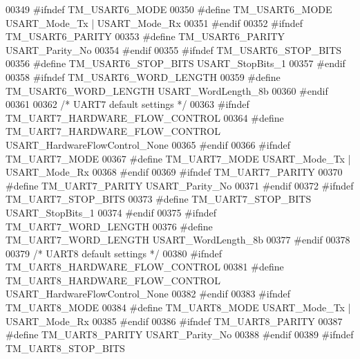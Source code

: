 \begin{DoxyCode}
00349 \textcolor{preprocessor}{#ifndef TM\_USART6\_MODE}
00350 \textcolor{preprocessor}{#define TM\_USART6\_MODE                      USART\_Mode\_Tx | USART\_Mode\_Rx}
00351 \textcolor{preprocessor}{#endif}
00352 \textcolor{preprocessor}{#ifndef TM\_USART6\_PARITY}
00353 \textcolor{preprocessor}{#define TM\_USART6\_PARITY                    USART\_Parity\_No}
00354 \textcolor{preprocessor}{#endif}
00355 \textcolor{preprocessor}{#ifndef TM\_USART6\_STOP\_BITS}
00356 \textcolor{preprocessor}{#define TM\_USART6\_STOP\_BITS                 USART\_StopBits\_1}
00357 \textcolor{preprocessor}{#endif}
00358 \textcolor{preprocessor}{#ifndef TM\_USART6\_WORD\_LENGTH}
00359 \textcolor{preprocessor}{#define TM\_USART6\_WORD\_LENGTH               USART\_WordLength\_8b}
00360 \textcolor{preprocessor}{#endif}
00361 
00362 \textcolor{comment}{/* UART7 default settings */}
00363 \textcolor{preprocessor}{#ifndef TM\_UART7\_HARDWARE\_FLOW\_CONTROL}
00364 \textcolor{preprocessor}{#define TM\_UART7\_HARDWARE\_FLOW\_CONTROL      USART\_HardwareFlowControl\_None}
00365 \textcolor{preprocessor}{#endif}
00366 \textcolor{preprocessor}{#ifndef TM\_UART7\_MODE}
00367 \textcolor{preprocessor}{#define TM\_UART7\_MODE                       USART\_Mode\_Tx | USART\_Mode\_Rx}
00368 \textcolor{preprocessor}{#endif}
00369 \textcolor{preprocessor}{#ifndef TM\_UART7\_PARITY}
00370 \textcolor{preprocessor}{#define TM\_UART7\_PARITY                     USART\_Parity\_No}
00371 \textcolor{preprocessor}{#endif}
00372 \textcolor{preprocessor}{#ifndef TM\_UART7\_STOP\_BITS}
00373 \textcolor{preprocessor}{#define TM\_UART7\_STOP\_BITS                  USART\_StopBits\_1}
00374 \textcolor{preprocessor}{#endif}
00375 \textcolor{preprocessor}{#ifndef TM\_UART7\_WORD\_LENGTH}
00376 \textcolor{preprocessor}{#define TM\_UART7\_WORD\_LENGTH                USART\_WordLength\_8b}
00377 \textcolor{preprocessor}{#endif}
00378 
00379 \textcolor{comment}{/* UART8 default settings */}
00380 \textcolor{preprocessor}{#ifndef TM\_UART8\_HARDWARE\_FLOW\_CONTROL}
00381 \textcolor{preprocessor}{#define TM\_UART8\_HARDWARE\_FLOW\_CONTROL      USART\_HardwareFlowControl\_None}
00382 \textcolor{preprocessor}{#endif}
00383 \textcolor{preprocessor}{#ifndef TM\_UART8\_MODE}
00384 \textcolor{preprocessor}{#define TM\_UART8\_MODE                       USART\_Mode\_Tx | USART\_Mode\_Rx}
00385 \textcolor{preprocessor}{#endif}
00386 \textcolor{preprocessor}{#ifndef TM\_UART8\_PARITY}
00387 \textcolor{preprocessor}{#define TM\_UART8\_PARITY                     USART\_Parity\_No}
00388 \textcolor{preprocessor}{#endif}
00389 \textcolor{preprocessor}{#ifndef TM\_UART8\_STOP\_BITS}

\end{DoxyCode}
